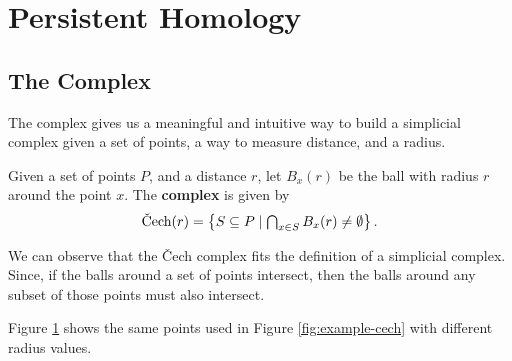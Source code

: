 \section{Persistent Homology}\label{sec:persistent-homology}

\subsection{The \cech Complex}\label{sec:cech-complex}

The \cech complex gives us a meaningful and intuitive way to build a simplicial complex given a set of points, a way to measure distance, and a radius.

\begin{definition}\label{def:cech-complex}
    Given a set of points \(P\), and a distance \(r\), let \(B_x(r)\) be the ball with radius \(r\) around the point \(x\).
    The \textbf{\cech complex} is given by
		\begin{align*}
            \Cech(r) = \left\{ S \subseteq P \mid \textstyle{\bigcap_{x\in S}} \,B_x(r) \neq \emptyset \right\}
            .
		\end{align*}
		\cite{wagner}
\end{definition}

We can observe that the \v{C}ech complex fits the definition of a simplicial complex.
Since, if the balls around a set of points intersect, then the balls around any subset of those points must also intersect.

\begin{example}\label{exa:example-cech-persistence}
    Figure \ref{fig:example-cech-r} shows the same points used in Figure \ref{fig:example-cech} with different radius values.

    \begin{figure}
        \centering
        \begin{minipage}{.3\textwidth}
            \centering
            
        \end{minipage}%
        \begin{minipage}{.3\textwidth}
            \centering
            
        \end{minipage}%
        \begin{minipage}{.4\textwidth}
            \centering
            
        \end{minipage}
        \caption{}
        \label{fig:example-cech-r}
    \end{figure}
\end{example}

